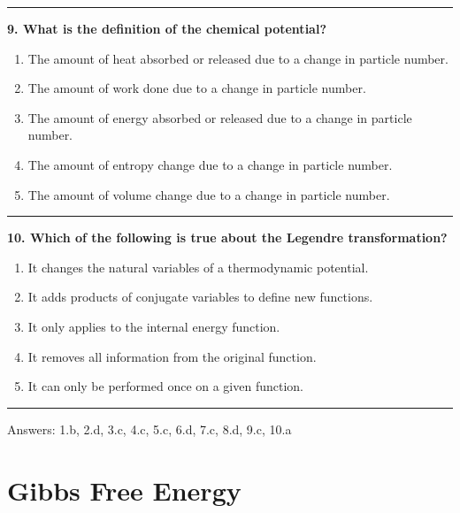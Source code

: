 \documentclass[
  9pt,
]{extbook}
\providecommand{\tightlist}{%
  \setlength{\itemsep}{0pt}\setlength{\parskip}{0pt}}
\theoremstyle{definition}
\theoremstyle{definition}
\theoremstyle{definition}
\theoremstyle{definition}
\theoremstyle{remark}
\begin{document}
\begin{center}\rule{0.5\linewidth}{0.5pt}\end{center}

\textbf{9. What is the definition of the chemical potential?}

\begin{enumerate}
\def\labelenumi{\alph{enumi}.}
\tightlist
\item
  The amount of heat absorbed or released due to a change in particle number.
\item
  The amount of work done due to a change in particle number.
\item
  The amount of energy absorbed or released due to a change in particle number.
\item
  The amount of entropy change due to a change in particle number.
\item
  The amount of volume change due to a change in particle number.
\end{enumerate}

\begin{center}\rule{0.5\linewidth}{0.5pt}\end{center}

\textbf{10. Which of the following is true about the Legendre transformation?}

\begin{enumerate}
\def\labelenumi{\alph{enumi}.}
\tightlist
\item
  It changes the natural variables of a thermodynamic potential.
\item
  It adds products of conjugate variables to define new functions.
\item
  It only applies to the internal energy function.
\item
  It removes all information from the original function.
\item
  It can only be performed once on a given function.
\end{enumerate}

\begin{center}\rule{0.5\linewidth}{0.5pt}\end{center}

Answers: 1.b, 2.d, 3.c, 4.c, 5.c, 6.d, 7.c, 8.d, 9.c, 10.a

\renewcommand*{\standardstate}{{-\kern-6pt{\ominus}\kern-6pt-}}

\chapter{Gibbs Free Energy}\label{GibbsFree}
\end{document}
